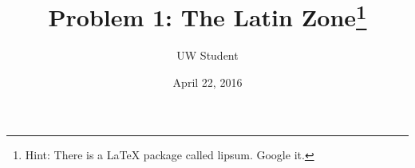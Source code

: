 \documentclass{article}
\title{Problem 1: The Latin Zone\footnote{Hint: There is a \LaTeX{} package called lipsum. Google it.}}
\author{UW Student}
\date{April 22, 2016}
\begin{document}
\maketitle

\lipsum
\end{document}
